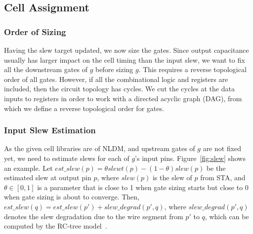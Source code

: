
\subsection{Cell Assignment}

\subsubsection{Order of Sizing}
\label{sec:sizing_order}

Having the slew target updated, we now size the gates. Since output capacitance usually has larger impact on the cell timing than the input slew, we want to fix all the downstream gates of $g$ before sizing $g$. This requires a reverse topological order of all gates. However, if all the combinational logic and registers are included, then the circuit topology has cycles. We cut the cycles at the data inputs to registers in order to work with a directed acyclic graph (DAG), from which we define a reverse topological order for gates.

\subsubsection{Input Slew Estimation}
As the given cell libraries are of NLDM, and upstream gates of $g$ are not fixed yet, we need to estimate slews for each of $g$'s input pins. Figure~\ref{fig:slew} shows an example. Let $est\_slew(p) = \theta slewt(p) - (1-\theta)slew(p)$ be the estimated slew at output pin $p$, where $slew(p)$ is the slew of $p$ from STA, and $\theta \in [0,1]$ is a parameter that is close to 1 when gate sizing starts but close to 0 when gate sizing is about to converge. Then, $est\_slew(q) = est\_slew(p') + slew\_degrad(p', q)$, where $slew\_degrad(p', q)$ denotes the slew degradation due to the wire segment from $p'$ to $q$, which can be computed by the RC-tree model~\cite{TAU:Contest}.

